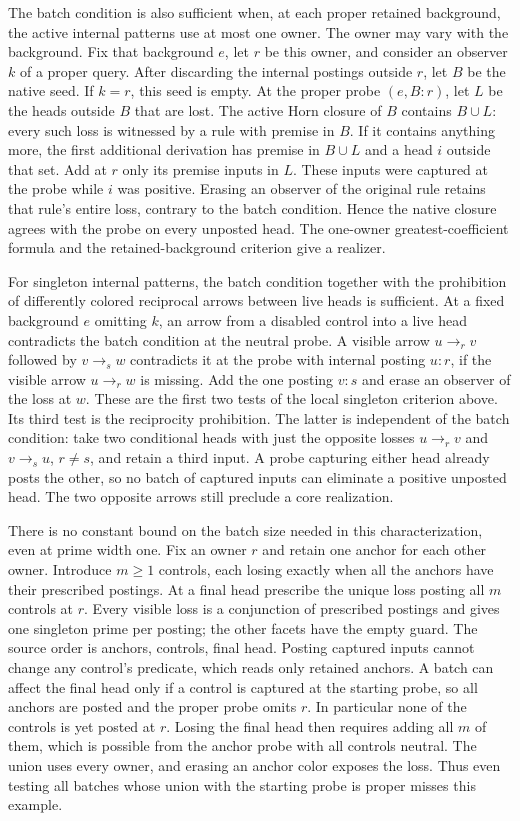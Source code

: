 The batch condition is also sufficient when, at each
proper retained background, the active internal
patterns use at most one owner. The owner may vary
with the background. Fix that background $e$, let
$r$ be this owner, and consider an observer $k$ of a
proper query. After discarding the internal postings
outside $r$, let $B$ be the native seed. If $k=r$,
this seed is empty. At the proper probe $(e,B:r)$,
let $L$ be the heads outside $B$ that are lost.
The active Horn closure of $B$ contains $B\cup L$:
every such loss is witnessed by a rule with premise
in $B$. If it contains anything more, the first
additional derivation has premise in $B\cup L$ and a
head $i$ outside that set. Add at $r$ only its
premise inputs in $L$. These inputs were captured at
the probe while $i$ was positive. Erasing an observer
of the original rule retains that rule's entire loss,
contrary to the batch condition. Hence the native
closure agrees with the probe on every unposted head.
The one-owner greatest-coefficient formula and the
retained-background criterion give a realizer.

For singleton internal patterns, the batch condition
together with the prohibition of differently colored
reciprocal arrows between live heads is sufficient.
At a fixed background $e$ omitting $k$, an arrow
from a disabled control into a live head contradicts
the batch condition at the neutral probe. A visible
arrow $u\to_r v$ followed by $v\to_s w$ contradicts it
at the probe with internal posting $u:r$, if the
visible arrow $u\to_r w$ is missing. Add the one
posting $v:s$ and erase an observer of the loss at
$w$. These are the first two tests of the local
singleton criterion above. Its third test is the
reciprocity prohibition. The latter is independent
of the batch condition: take two conditional heads
with just the opposite losses $u\to_r v$ and
$v\to_s u$, $r\ne s$, and retain a third input.
A probe capturing either head already posts the
other, so no batch of captured inputs can eliminate
a positive unposted head. The two opposite arrows
still preclude a core realization.

There is no constant bound on the batch size needed
in this characterization, even at prime width one.
Fix an owner $r$ and retain one anchor for each
other owner. Introduce $m\geq1$ controls, each
losing exactly when all the anchors have their
prescribed postings. At a final head prescribe the
unique loss posting all $m$ controls at $r$.
Every visible loss is a conjunction of prescribed
postings and gives one singleton prime per posting;
the other facets have the empty guard. The source
order is anchors, controls, final head. Posting
captured inputs cannot change any control's
predicate, which reads only retained anchors.
A batch can affect the final head only if a
control is captured at the starting probe, so all
anchors are posted and the proper probe omits $r$.
In particular none of the controls is yet posted
at $r$. Losing the final head then requires adding
all $m$ of them, which is possible from the anchor
probe with all controls neutral. The union uses
every owner, and erasing an anchor color exposes
the loss. Thus even testing all batches whose
union with the starting probe is proper misses
this example.

